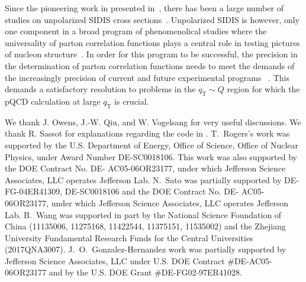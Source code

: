 \documentclass[prd,preprintnumbers,nofootinbib,superscriptaddress,onecolumn,preprint]{revtex4-1}
\newcommand\3[1]{\boldsymbol{#1}}
\newcommand{\Tsc}[2]{#1_{#2\text{T}}}
\begin{document}
	Since the pioneering work in presented in~\cite{Meng:1995yn,Graudenz:1996an,Nadolsky:1999kb}, there has been a large number of
	studies on unpolarized SIDIS cross sections~\cite{Koike:2006fn,Anselmino:2006rv,Anselmino:2013lza,Signori:2013mda,Sun:2013hua,Su:2014wpa,Bacchetta:2017gcc}. Unpolarized SIDIS is however, only one component in a broad program of phenomenolical studies where the universality of parton correlation functions plays a central role in testing pictures of nucleon structure~\cite{Anselmino:2016uie,Anselmino:2015sxa,Bacchetta:2015ora,Scimemi:2017etj,Kang:2017btw,Kang:2014zza,Landry:2002ix,Sun:2016kkh,Sun:2011iw,Echevarria:2015uaa,Guzzi:2013aja,Echevarria:2016scs,Echevarria:2014xaa,Boglione:2018dqd,Boglione:2017jlh,Kang:2015msa,Lin:2017stx,Ye:2016prn,Bacchetta:2019tcu,Bastami:2018xqd,Bertone:2019nxa}. In order for this program to be successful, the precision in the determination of parton correlation functions needs to meet the demands of the increasingly precision of current and future experimental programs
	~\cite{Airapetian:2012ki,Adolph:2013stb,Adolph:2016bga,Seidl:2019jei,Aschenauer:2019kzf,Bradamante:2018ick}. This demands a satisfactory resolution to problems in the $\Tsc{q}{} \sim Q$ region for which the pQCD calculation at large $\Tsc{q}{}$ is crucial.

\appendix
\begin{acknowledgments}	
We thank J. Owens, J.-W. Qiu, and W. Vogelsang for very useful 
discussions.  We thank R. Sassot for explanations regarding the code in \cite{Daleo:2004pn}. 
%
T.~Rogers's work was supported by the U.S. Department of Energy, Office of 
Science, Office of Nuclear Physics, under Award Number DE-SC0018106. This work was 
also supported by the DOE Contract No. DE- AC05-06OR23177, under which Jefferson 
Science Associates, LLC operates Jefferson Lab. 
%
N.~Sato was partially supported by DE-FG-04ER41309, DE-SC0018106 and 
the DOE Contract No. DE- AC05-06OR23177, under which Jefferson 
Science Associates, LLC operates Jefferson Lab. 
%
B.~Wang was supported in part by the National Science Foundation of China 
(11135006, 11275168, 11422544, 11375151, 11535002) and the Zhejiang University Fundamental
Research Funds for the Central Universities (2017QNA3007). 
%
J.~O.~Gonzalez-Hernandez work was partially supported
by Jefferson Science Associates, LLC under  U.S. DOE Contract \#DE-AC05-06OR23177 and by the 
U.S. DOE Grant \#DE-FG02-97ER41028.
\end{acknowledgments}
\end{document}
